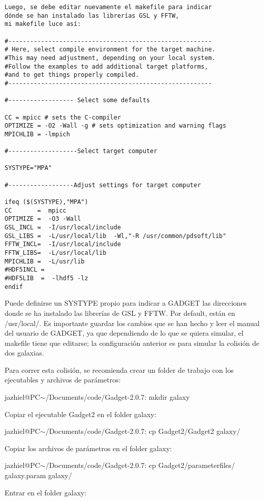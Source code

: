 \documentclass[a4paper,openright,12pt]{book}
\begin{document}
\begin{enumerate}
\begin{verbatim}
Luego, se debe editar nuevamente el makefile para indicar 
dónde se han instalado las librerías GSL y FFTW,
mi makefile luce así:

#--------------------------------------------------------
# Here, select compile environment for the target machine. 
#This may need adjustment, depending on your local system. 
#Follow the examples to add additional target platforms, 
#and to get things properly compiled.
#--------------------------------------------------------

#------------------ Select some defaults

CC = mpicc # sets the C-compiler
OPTIMIZE = -O2 -Wall -g # sets optimization and warning flags
MPICHLIB = -lmpich

#-------------------Select target computer

SYSTYPE="MPA"

#------------------Adjust settings for target computer

ifeq ($(SYSTYPE),"MPA")
CC       =  mpicc   
OPTIMIZE =  -O3 -Wall
GSL_INCL =  -I/usr/local/include
GSL_LIBS =  -L/usr/local/lib  -Wl,"-R /usr/common/pdsoft/lib"
FFTW_INCL=  -I/usr/local/include
FFTW_LIBS=  -L/usr/local/lib
MPICHLIB =  -L/usr/lib
#HDF5INCL =  
#HDF5LIB  =  -lhdf5 -lz 
endif
\end{verbatim}
Puede definirse un \textsf{SYSTYPE} propio para indicar a GADGET las direcciones donde se ha instalado las librerías de GSL y FFTW. Por default, están en \textsf{/usr/local/}. Es importante guardar los cambios que se han hecho y leer el manual del usuario de GADGET, ya que dependiendo de lo que se quiera simular, el \textsf{makefile} tiene que editarse; la configuración anterior es para simular la colisión de dos galaxias.

Para correr esta colisión, se recomienda crear un folder de trabajo con los ejecutables y archivos de parámetros:

\textsf{jazhiel@PC$\sim$/Documents/code/Gadget-2.0.7: mkdir galaxy}

Copiar el ejecutable \textsf{Gadget2} en el folder \textsf{galaxy}:

\textsf{jazhiel@PC$\sim$/Documents/code/Gadget-2.0.7: cp Gadget2/Gadget2 galaxy/}

Copiar los archivos de parámetros en el folder \textsf{galaxy}:

\textsf{jazhiel@PC$\sim$/Documents/code/Gadget-2.0.7: cp Gadget2/parameterfiles/
galaxy.param galaxy/}

Entrar en el folder \textsf{galaxy}:


\end{enumerate}
\end{document}
